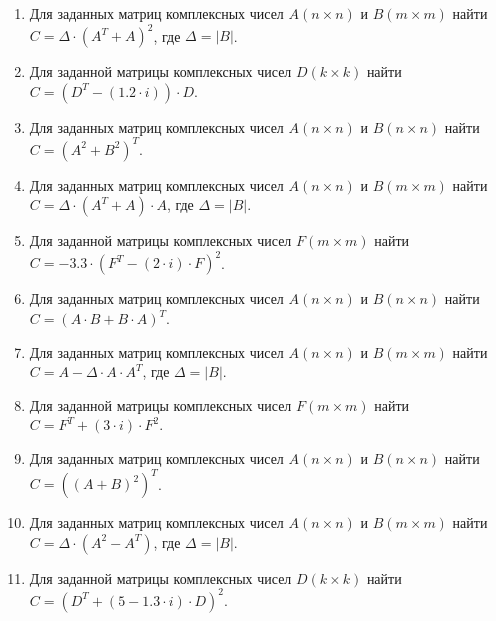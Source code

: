 \begin{enumerate}
\item Для заданных матриц комплексных чисел $A(n \times n)$ и $B(m \times m)$ найти   $C=\Delta\cdot (A^T+A)^2$, где  $\Delta=|B|$.
\item Для заданной матрицы комплексных чисел $D(k \times k)$ найти $C=(D^T-(1.2\cdot i))\cdot D$.
\item Для заданных матриц комплексных чисел $A(n \times n)$ и $B(n \times n)$ найти  $C=(A^2+B^2)^T$.
\item Для заданных матриц комплексных чисел $A(n \times n)$ и $B(m \times m)$ найти  $C=\Delta\cdot (A^T+A)\cdot A$, где  $\Delta=|B|$.
\item Для заданной матрицы комплексных чисел $F(m \times m)$ найти  $C=-3.3\cdot (F^T-(2\cdot i)\cdot F)^2$. 
\item Для заданных матриц комплексных чисел $A(n \times n)$ и $B(n \times n)$ найти   $C=(A\cdot B+B\cdot A)^T$.
\item Для заданных матриц комплексных чисел $A(n \times n)$ и $B(m \times m)$ найти  $C=A-\Delta\cdot A\cdot A^T$, где  $\Delta=|B|$.
\item Для заданной матрицы комплексных чисел $F(m \times m)$ найти  $C=F^T+(3\cdot i)\cdot F^2$. 
\item Для заданных матриц комплексных чисел $A(n \times n)$ и $B(n \times n)$ найти   $C=((A+B)^2)^T$.
\item Для заданных матриц комплексных чисел $A(n \times n)$ и $B(m \times m)$ найти  $C=\Delta\cdot (A^2-A^T)$, где  $\Delta=|B|$.
\item Для заданной матрицы комплексных чисел $D(k \times k)$ найти $C=(D^T+(5-1.3\cdot i)\cdot D)^2$.
\end{enumerate}
